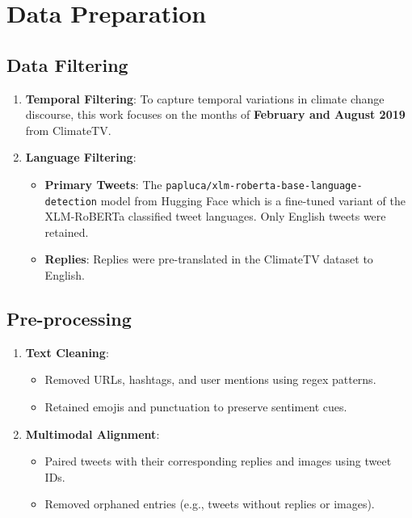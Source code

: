 \section{Data Preparation}

\subsection{Data Filtering}
\begin{enumerate}
    \item \textbf{Temporal Filtering}: To capture temporal variations in climate change discourse, this work focuses on the months of \textbf{February and August 2019} from ClimateTV.
    \item \textbf{Language Filtering}:
    \begin{itemize}
        \item \textbf{Primary Tweets}: The \texttt{papluca/xlm-roberta-base-language-detection} model from Hugging Face \cite{papluca_xlm_roberta_base_language_detection} which is a fine-tuned variant of the XLM-RoBERTa \cite{DBLP:journals/corr/abs-1911-02116} classified tweet languages. Only English tweets were retained.
        \item \textbf{Replies}: Replies were pre-translated in the ClimateTV dataset to English.
    \end{itemize}
\end{enumerate}

\subsection{Pre-processing}
\begin{enumerate}
    \item \textbf{Text Cleaning}:
    \begin{itemize}
        \item Removed URLs, hashtags, and user mentions using regex patterns.
        \item Retained emojis and punctuation to preserve sentiment cues.
    \end{itemize}
    \item \textbf{Multimodal Alignment}:
    \begin{itemize}
        \item Paired tweets with their corresponding replies and images using tweet IDs.
        \item Removed orphaned entries (e.g., tweets without replies or images).
    \end{itemize}
\end{enumerate}

